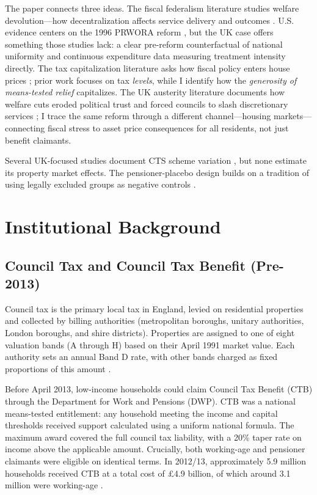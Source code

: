 \documentclass[12pt]{article}
\begin{document}
The paper connects three ideas. The fiscal federalism literature studies welfare devolution---how decentralization affects service delivery and outcomes \citep{oates1972, besley2003}. U.S. evidence centers on the 1996 PRWORA reform \citep{blank2002, ziliak2006}, but the UK case offers something those studies lack: a clear pre-reform counterfactual of national uniformity and continuous expenditure data measuring treatment intensity directly. The tax capitalization literature asks how fiscal policy enters house prices \citep{oates1969, palmon1998, hilber2016}; prior work focuses on tax \textit{levels}, while I identify how the \textit{generosity of means-tested relief} capitalizes. The UK austerity literature documents how welfare cuts eroded political trust \citep{fetzer2019} and forced councils to slash discretionary services \citep{innes2020, ogden2022}; I trace the same reform through a different channel---housing markets---connecting fiscal stress to asset price consequences for all residents, not just benefit claimants.

Several UK-focused studies document CTS scheme variation \citep{adam2017, ogden2022}, but none estimate its property market effects. The pensioner-placebo design builds on a tradition of using legally excluded groups as negative controls \citep{autor2003, chetty2009}.


\section{Institutional Background}\label{sec:background}

\subsection{Council Tax and Council Tax Benefit (Pre-2013)}

Council tax is the primary local tax in England, levied on residential properties and collected by billing authorities (metropolitan boroughs, unitary authorities, London boroughs, and shire districts). Properties are assigned to one of eight valuation bands (A through H) based on their April 1991 market value. Each authority sets an annual Band D rate, with other bands charged as fixed proportions of this amount \citep{adam2017}.

Before April 2013, low-income households could claim Council Tax Benefit (CTB) through the Department for Work and Pensions (DWP). CTB was a national means-tested entitlement: any household meeting the income and capital thresholds received support calculated using a uniform national formula. The maximum award covered the full council tax liability, with a 20\% taper rate on income above the applicable amount. Crucially, both working-age and pensioner claimants were eligible on identical terms. In 2012/13, approximately 5.9 million households received CTB at a total cost of \pounds4.9 billion, of which around 3.1 million were working-age \citep{dluhc2013stats}.
\end{document}
